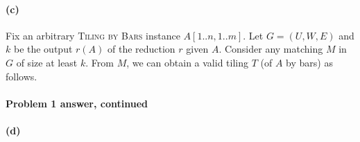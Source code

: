 
\paragraph{(c)}


 Fix an arbitrary \textsc{Tiling by Bars} instance $A[1..n, 1..m]$. 
 Let $G=(U,W,E)$ and $k$ be the output $r(A)$ of the reduction $r$ given $A$.
 Consider any matching $M$ in $G$ of size at least $k$. 
 From $M$, we can obtain a valid tiling $T$ (of $A$ by bars) as follows.
 
\begin{blue}
  \REPLACEME
\end{blue}

\newpage                        %

\paragraph{Problem 1 answer, continued}


\paragraph{(d)}


